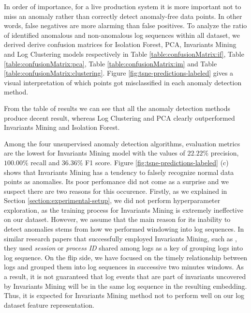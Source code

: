 In order of importance, for a live production system it is more important not to miss an anomaly rather than correctly detect anomaly-free data points. In other words, false negatives are more alarming than false positives. To analyze the ratio of identified anomalous and non-anomalous log sequences within all dataset, we derived derive confusion matrices for Isolation Forest, PCA, Invariants Mining and Log Clustering models respectively in Table \ref{table:confusionMatrix:if}, Table \ref{table:confusionMatrix:pca}, Table \ref{table:confusionMatrix:im} and Table \ref{table:confusionMatrix:clustering}. Figure \ref{fig:tsne-predictions-labeled} gives a visual interpretation of which points got misclassified in each anomaly detection method. 

From the table of results we can see that all the anomaly detection methods produce decent result, 
whereas Log Clustering and PCA clearly outperformed Invariants Mining and Isolation Forest. 

Among the four unsupervised anomaly detection algorithms, evaluation metrics are the lowest for Invariants Mining model with the values of $22.22\%$ precision, $100.00\%$ recall and $36.36\%$ F1 score. Figure \ref{fig:tsne-predictions-labeled} (c) shows that Invariants Mining has a tendency to falsely recognize normal data points as anomalies. Its poor perfomance did not come as a surprise and we suspect there are two reasons for this occurence. Firstly, as we explained in Section \ref{section:experimental-setup}, we did not perform hyperparameter exploration, as the training process for Invariants Mining is extremely ineffective on our dataset. However, we assume that the main reason for its inability to detect anomalies stems from how we performed windowing into log sequences. In similar research papers that successfully employed Invariants Mining, such as , they used \textit{session} or \textit{process ID} shared among logs as a key of grouping logs into log sequence. On the flip side, we have focused on the timely relationship between logs and grouped them into log sequences in successive two minutes windows. As a result, it is not guaranteed that log events that are part of invariants uncovered by Invariants Mining will be in the same log sequence in the resulting embedding. Thus, it is expected for Invariants Mining method not to perform well on our log dataset feature representation.

